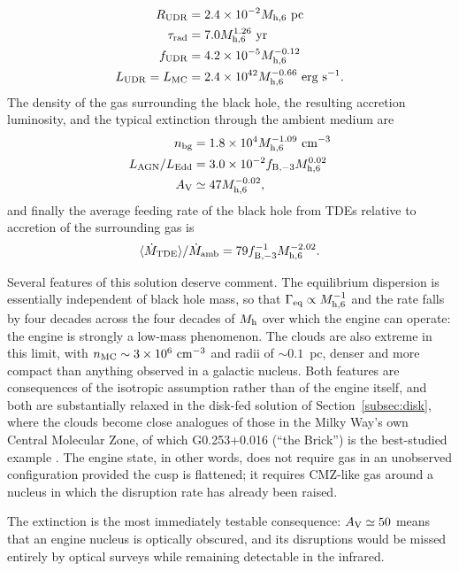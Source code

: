 \documentclass[preprint2]{aastex}
\newcommand{\mhsix}{M_{\rm h,6}\xspace}
\begin{document}
\begin{align}
R_{\rm UDR} &= 2.4 \times 10^{-2} \mhsix~{\rm pc}\\
\tau_{\rm rad} &= 7.0 \mhsix^{1.26}~{\rm yr}\\
f_{\rm UDR} &= 4.2 \times 10^{-5} \mhsix^{-0.12}\\
L_{\rm UDR} = L_{\rm MC} &= 2.4 \times 10^{42} \mhsix^{-0.66}~{\rm erg~s}^{-1}.
\end{align}
The density of the gas surrounding the black hole, the resulting accretion luminosity, and the typical extinction through the ambient medium are
\begin{align}
n_{\rm bg} &= 1.8 \times 10^{4} \mhsix^{-1.09}~{\rm cm}^{-3}\\
L_{\rm AGN}/L_{\rm Edd} &= 3.0 \times 10^{-2} f_{\rm B,-3} \mhsix^{0.02}\\
A_{\rm V} &\simeq 47 \mhsix^{-0.02},
\end{align}
and finally the average feeding rate of the black hole from TDEs relative to accretion of the surrounding gas is
\begin{equation}
\langle \dot{M}_{\rm TDE} \rangle / \dot{M}_{\rm amb} = 79 f_{\rm B,-3}^{-1}\mhsix^{-2.02}.\label{eq:eqaccratio}
\end{equation}

Several features of this solution deserve comment. The equilibrium dispersion is essentially independent of black hole mass, so that $\Gamma_{\rm eq} \propto \mhsix^{-1}$ and the rate falls by four decades across the four decades of $M_{\rm h}$ over which the engine can operate: the engine is strongly a low-mass phenomenon. The clouds are also extreme in this limit, with $n_{\rm MC} \sim 3 \times 10^{6}~{\rm cm}^{-3}$ and radii of $\sim 0.1$~pc, denser and more compact than anything observed in a galactic nucleus. Both features are consequences of the isotropic assumption rather than of the engine itself, and both are substantially relaxed in the disk-fed solution of Section~\ref{subsec:disk}, where the clouds become close analogues of those in the Milky Way's own Central Molecular Zone, of which G0.253+0.016 (``the Brick'') is the best-studied example \citep{Longmore:2013a,Kruijssen:2014a,Barnes:2017a}. The engine state, in other words, does not require gas in an unobserved configuration provided the cusp is flattened; it requires CMZ-like gas around a nucleus in which the disruption rate has already been raised.

The extinction is the most immediately testable consequence: $A_{\rm V} \simeq 50$ means that an engine nucleus is optically obscured, and its disruptions would be missed entirely by optical surveys while remaining detectable in the infrared.
\end{document}

